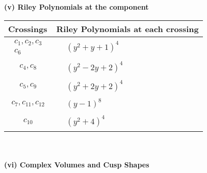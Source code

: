 \documentclass[1p]{elsarticle_modified}
\theoremstyle{definition}
\begin{document}
\newpage\renewcommand{\arraystretch}{1}
\flushleft \textbf{(v) Riley Polynomials at the component}\newline \\
\begin{tabular}{m{50pt}|m{274pt}}
Crossings & \hspace{64pt}Riley Polynomials at each crossing \\
\hline $$\begin{aligned}c_{1},c_{2},c_{3}\\c_{6}\end{aligned}$$&$\begin{aligned}
&(y^2+y+1)^4
\end{aligned}$\\
\hline $$\begin{aligned}c_{4},c_{8}\end{aligned}$$&$\begin{aligned}
&(y^2-2 y+2)^4
\end{aligned}$\\
\hline $$\begin{aligned}c_{5},c_{9}\end{aligned}$$&$\begin{aligned}
&(y^2+2 y+2)^4
\end{aligned}$\\
\hline $$\begin{aligned}c_{7},c_{11},c_{12}\end{aligned}$$&$\begin{aligned}
&(y-1)^8
\end{aligned}$\\
\hline $$\begin{aligned}c_{10}\end{aligned}$$&$\begin{aligned}
&(y^2+4)^4
\end{aligned}$\\
\hline
\end{tabular}\\~\\
\newpage\flushleft \textbf{(vi) Complex Volumes and Cusp Shapes}
\end{document}
